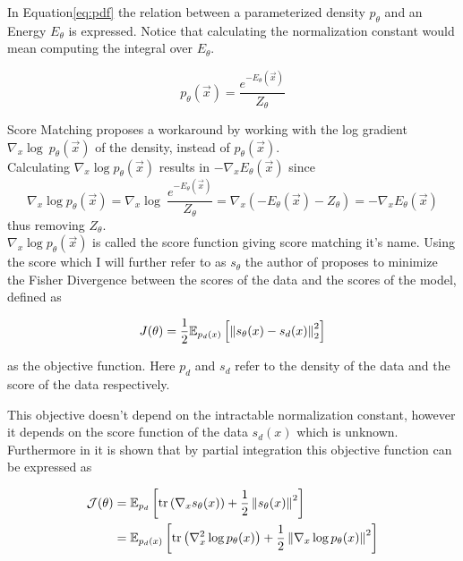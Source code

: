 In Equation\ref{eq:pdf} the relation between a parameterized density $p_\theta$ and an Energy $E_\theta$ is expressed. Notice that calculating the normalization constant would 
mean computing the integral over $E_\theta$.

\begin{equation}
    \label{eq:pdf}
    p_\theta(\vec x) = \frac{e^{-E_\theta(\vec x)}}{Z_\theta}
\end{equation}

Score Matching proposes a workaround by working with the log gradient $\nabla_x \log \ p_\theta(\vec x)$ of the density, 
instead of $p_\theta(\vec x)$. \\

Calculating $\nabla_x \log p_\theta(\vec x)$ results in $- \nabla_x E_\theta(\vec x)$ since 
\[\nabla_x \log p_\theta(\vec x) = \nabla_x \log \ \frac{e^{- E_\theta(\vec x)}}{Z_\theta} = \nabla_x \left( - E_\theta(\vec x) - {Z_\theta} \right) = - \nabla_x E_\theta(\vec x)\]
thus removing $Z_\theta$.\\

$\nabla_x \log p_\theta(\vec x)$ is called the score function giving score matching it's name.
Using the score which I will further refer to as $s_\theta$ the author of \cite{sm} proposes to minimize the Fisher Divergence between 
the scores of the data and the scores of the model, defined as 

\begin{equation}
    \label{eq:fisher}
    J(\theta) = \frac{1}{2} \mathbb{E}_{p_d(x)} \left[ \left\lVert s_\theta(x) - s_d(x)\right\rVert^2_2 \right]
\end{equation}

as the objective function. Here $p_d$ and $s_d$ refer to the density of the data and the score of the data respectively.

This objective doesn't depend on the intractable normalization constant, however it depends on the score function of the data 
$s_d(x)$ which is unknown. Furthermore in \cite{sm} it is shown that by partial integration this objective function can be expressed as 

\begin{align}
    \label{eq:sm_objective}
    \mathcal{J}(\theta) & = \mathbb{E}_{p_d} \left[\text{tr} \left( \nabla_x s_\theta(x) \right) + \frac{1}{2} \left\| s_\theta(x) \right\|^2 \right] \notag \\ 
    & = \mathbb{E}_{p_d(x)} \left[\text{tr} \left( \nabla_x^2 \log p_\theta(x) \right) + \frac{1}{2} \left\| \nabla_x \log p_\theta(x) \right\|^2 \right]
\end{align}

